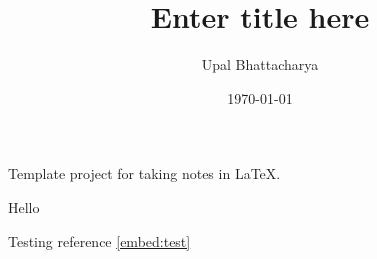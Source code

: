 \documentclass[a4paper,colorinlistoftodos]{article}
\author{Upal Bhattacharya}
\date{\today}
\title{Enter title here}
\begin{document}
\maketitle

\begingroup
    \hypersetup{linkcolor=black}
    \tableofcontents
    \pagebreak
\endgroup

\linenumbers

Template project for taking notes in \LaTeX.


\begin{testembed}
  \label{embed:test}
  Hello
\end{testembed}

Testing reference \ref{embed:test}




\pagebreak
\nolinenumbers
\appendix

\begingroup
    \hypersetup{linkcolor=black}
    \listoftodos
    \listofchanges
    \pagebreak
\endgroup
\end{document}
